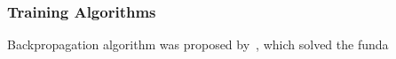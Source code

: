 \subsubsection{Training Algorithms}
Backpropagation algorithm was proposed by~\citet{werbos1975beyond}, which solved the funda